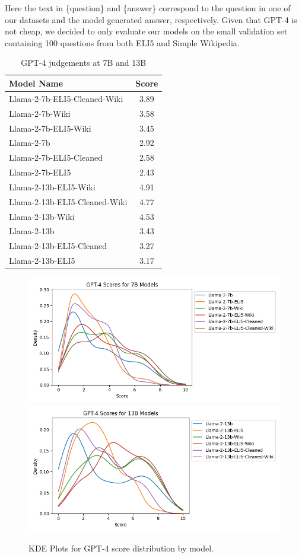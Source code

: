 \documentclass[11pt, oneside]{article}   	%
\begin{document}
Here the text in \{question\} and \{answer\} correspond to the question in one of our datasets and the model generated answer, respectively.
Given that GPT-4 is not cheap, we decided to only evaluate our models on the small validation set containing 100 questions from both ELI5 and Simple Wikipedia.

\begin{table}
\centering
\begin{tabular}{|l|c|}
\hline
Model Name & Score \\
\hline
Llama-2-7b-ELI5-Cleaned-Wiki & 3.89 \\
Llama-2-7b-Wiki & 3.58 \\
Llama-2-7b-ELI5-Wiki & 3.45 \\
Llama-2-7b & 2.92 \\
Llama-2-7b-ELI5-Cleaned & 2.58 \\
Llama-2-7b-ELI5 & 2.43 \\
\hline\hline 
Llama-2-13b-ELI5-Wiki & 4.91 \\
Llama-2-13b-ELI5-Cleaned-Wiki & 4.77 \\
Llama-2-13b-Wiki & 4.53 \\
Llama-2-13b & 3.43 \\
Llama-2-13b-ELI5-Cleaned & 3.27 \\
Llama-2-13b-ELI5 & 3.17 \\
\hline
\end{tabular}
\caption{GPT-4 judgements at 7B and 13B}
\label{tab:GPT4-judgements}
\end{table}

\begin{figure}
\includegraphics[scale=.6]{./figures/GPT4_7B_scores.png}
\includegraphics[scale=.6]{./figures/GPT4_13B_scores.png}
\caption{KDE Plots for GPT-4 score distribution by model.}
\label{fig:GPT_4_scores}
\end{figure}
  
\end{document}
